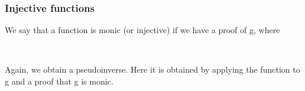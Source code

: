 \subsubsection{Injective functions}\label{injective-functions}
We say that a function  is monic (or injective) if we have a proof of  \ab g, where
\ccpad
\begin{code}%
\>[0][@{}l@{\AgdaIndent{1}}]%
\>[1]\AgdaSpace{}%
\AgdaSymbol{:}\AgdaSpace{}%
\AgdaSymbol{\{}\AgdaSpace{}%
\AgdaSymbol{:}\AgdaSpace{}%
\AgdaSpace{}%
\AgdaSpace{}%
\AgdaSymbol{\}}\AgdaSpace{}%
\AgdaSymbol{\{}\AgdaSpace{}%
\AgdaSymbol{:}\AgdaSpace{}%
\AgdaSpace{}%
\AgdaSpace{}%
\AgdaSymbol{\}(}\AgdaSpace{}%
\AgdaSymbol{:}\AgdaSpace{}%
\AgdaSpace{}%
\AgdaSpace{}%
\AgdaSymbol{)}\AgdaSpace{}%
\AgdaSpace{}%
\AgdaSpace{}%
\AgdaSpace{}%
\AgdaSpace{}%
\<%
\\
%
\>[1]\AgdaSpace{}%
\AgdaSpace{}%
\AgdaSymbol{=}\AgdaSpace{}%
\AgdaSpace{}%
\AgdaSpace{}%
\AgdaSpace{}%
\AgdaSpace{}%
\AgdaSpace{}%
\AgdaSpace{}%
\AgdaSpace{}%
\AgdaSpace{}%
\AgdaSpace{}%
\AgdaSpace{}%
\AgdaSpace{}%
\AgdaSpace{}%
\<%
\end{code}
\ccpad
Again, we obtain a pseudoinverse. Here it is obtained by applying the function  to \ab g and a proof that \ab g is monic.
\ccpad

